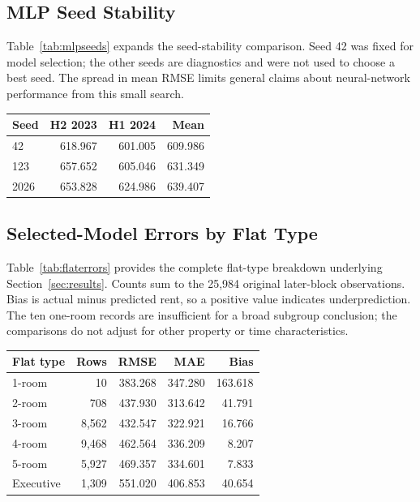 \documentclass[conference]{IEEEtran}
\makeatletter
\newenvironment{localtable}{\par\addvspace{\medskipamount}\noindent
  \begin{minipage}{\columnwidth}\def\@captype{table}}{\end{minipage}\par
  \addvspace{\medskipamount}}
\makeatother
\begin{document}
\subsection{MLP Seed Stability}
Table~\ref{tab:mlpseeds} expands the seed-stability comparison. Seed 42 was
fixed for model selection; the other seeds are diagnostics and were not
used to choose a best seed. The spread in mean RMSE limits general claims
about neural-network performance from this small search.
\begin{localtable}
  \caption{MLP RMSE by seed with the same 35 base inputs and training protocol.}
  \label{tab:mlpseeds}
  \centering\small
  \setlength{\tabcolsep}{3pt}
  \begin{tabularx}{\columnwidth}{Xrrr}
    \toprule
Seed & H2 2023 & H1 2024 & Mean \\
    \midrule
42 & 618.967 & 601.005 & 609.986 \\
123 & 657.652 & 605.046 & 631.349 \\
2026 & 653.828 & 624.986 & 639.407 \\
    \bottomrule
  \end{tabularx}
\end{localtable}

\subsection{Selected-Model Errors by Flat Type}
Table~\ref{tab:flaterrors} provides the complete flat-type breakdown underlying
Section~\ref{sec:results}. Counts sum to the 25,984 original later-block
observations. Bias is actual minus predicted rent, so a positive value
indicates underprediction. The ten one-room records are insufficient for
a broad subgroup conclusion; the comparisons do not adjust for other
property or time characteristics.
\begin{localtable}
  \caption{CatBoost flat-type errors, July 2024--March 2025.}
  \label{tab:flaterrors}
  \centering\small
  \setlength{\tabcolsep}{3pt}
  \begin{tabularx}{\columnwidth}{Xrrrr}
    \toprule
Flat type & Rows & RMSE & MAE & Bias \\
    \midrule
1-room & 10 & 383.268 & 347.280 & 163.618 \\
2-room & 708 & 437.930 & 313.642 & 41.791 \\
3-room & 8,562 & 432.547 & 322.921 & 16.766 \\
4-room & 9,468 & 462.564 & 336.209 & 8.207 \\
5-room & 5,927 & 469.357 & 334.601 & 7.833 \\
Executive & 1,309 & 551.020 & 406.853 & 40.654 \\
    \bottomrule
  \end{tabularx}
\end{localtable}
\end{document}
